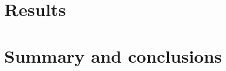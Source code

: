 \documentclass[nocoverpage,swedish,g5paper]{thesis}
\begin{document}
\chapter{Results}\label{ch:ColliderPhenomenology}


\chapter{Summary and conclusions}\label{ch:Summary}



%





%
\end{document}
